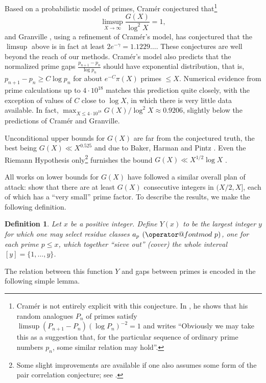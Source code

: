 \documentclass[11pt]{amsart}
\makeatletter
\numberwithin{equation}{section}  %
\theoremstyle{remark}
\theoremstyle{plain}
\newtheorem{definition}{Definition}
\numberwithin{equation}{section}
\renewcommand{\pmod}[1]{\allowbreak\mkern7mu({\operator@font mod}\,\,#1)}
\renewcommand{\le}{\leqslant}
\renewcommand{\leq}{\leqslant}
\renewcommand{\ge}{\geqslant}
\renewcommand{\(}{\left(}
\renewcommand{\)}{\right)}
\makeatother
\begin{document}
Based on a probabilistic model of primes, Cram\'er \cite{Cra} conjectured
that\footnote{Cram\'er is not entirely explicit with this conjecture.
In \cite{Cra}, he shows that his random analogues $P_n$ of
primes satisfy $\limsup (P_{n+1}-P_n)(\log P_n)^{-2}=1$ and writes ``Obviously we
may take this as a suggestion that, for the particular sequence of
ordinary prime numbers $p_n$, some similar relation may hold''.}
\[
\limsup_{X\to\infty} \frac{G(X)}{\log^2 X} = 1, 
\]
and Granville \cite{Gra}, using a refinement of Cram\'er's model,
has conjectured that the $\limsup$ above is in fact at least $2e^{-\gamma}=1.1229\ldots$.  These conjectures are well beyond the reach of our methods.
Cram\'er's model also predicts that the normalized prime gaps
$\frac{p_{n+1}-p_n}{\log p_n}$ should have exponential distribution, that is,
$p_{n+1}-p_n \ge C\log p_n$ for about $e^{-C}\pi(X)$ primes $\le X$.
Numerical evidence from prime calculations up to 
$4\cdot 10^{18}$ \cite{numerical-tos}
matches this prediction quite closely, with the exception of values of $C$
close to $\log X$, in which there is very little data available.  In fact,
$\max_{X\le 4\cdot 10^{18}} G(X)/\log^2 X \approx 0.9206$, slightly below the
predictions of Cram\'er and Granville.

Unconditional upper bounds for $G(X)$ are far from the conjectured
truth, the best being
$G(X) \ll X^{0.525}$ and due to Baker, Harman and Pintz \cite{BHP}.
Even the Riemann Hypothesis only\footnote{Some slight improvements are available if one also assumes some form of the pair correlation conjecture; see \cite{heath}.} furnishes the bound $G(X)\ll X^{1/2}\log X$ \cite{Cra1920}.

All works on lower bounds for $G(X)$ have followed a similar overall plan
of attack: show that there are at least $G(X)$ consecutive
integers in $(X/2,X]$, 
each of which has a ``very small'' prime factor.  
To describe the results, we make the following definition.

\begin{definition}\label{y-def}
Let $x$ be a positive integer. Define $Y(x)$ to be the largest integer $y$ for which one may select residue classes $a_p \pmod{p}$, one for each prime $p \leq x$, which together ``sieve out'' (cover) the whole interval $[y] = \{1,\dots,y\}$.
\end{definition}

The relation between this function $Y$ and gaps between primes is encoded in the following simple lemma.
\end{document}
